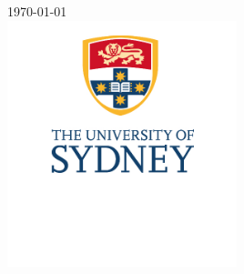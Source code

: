 \begin{titlepage}
{\large \today}\\[2cm] %


\includegraphics[width=0.5\textwidth]{Images/USYDlogo.jpg} %
 

\vfill %
\end{titlepage}